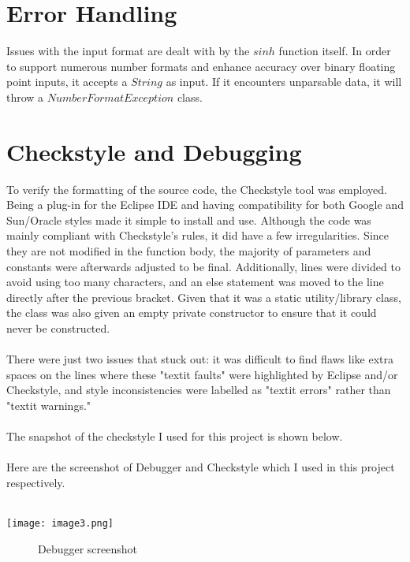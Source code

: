\documentclass[letterpaper, 11pt]{report}
\begin{document}
\section*{{Error Handling}}
\normalsize{Issues with the input format are dealt with by the $sinh$ function itself. In order to support numerous number formats and enhance accuracy over binary floating point inputs, it accepts a $String$ as input. If it encounters unparsable data, it will throw a $NumberFormatException$ class.}

\section*{{Checkstyle and Debugging}}
To verify the formatting of the source code, the Checkstyle tool was employed. Being a plug-in for the Eclipse IDE and having compatibility for both Google and Sun/Oracle styles made it simple to install and use. Although the code was mainly compliant with Checkstyle's rules, it did have a few irregularities. Since they are not modified in the function body, the majority of parameters and constants were afterwards adjusted to be final. Additionally, lines were divided to avoid using too many characters, and an else statement was moved to the line directly after the previous bracket. Given that it was a static utility/library class, the class was also given an empty private constructor to ensure that it could never be constructed.\\\\


There were just two issues that stuck out: it was difficult to find flaws like extra spaces on the lines where these "textit faults" were highlighted by Eclipse and/or Checkstyle, and style inconsistencies were labelled as "textit errors" rather than "textit warnings." \\\\ 
The snapshot of the checkstyle I used for this project is shown below.\\\\

Here are the screenshot of Debugger and Checkstyle which I used in this project respectively.\\\\
\begin{center}
    \texttt{[image: image3.png]} \\
    \begin{figure}[h!]
    \centering
        \caption{Debugger screenshot}
        \label{Debugger screenshot}
    \end{figure}
\end{center}
\end{document}
